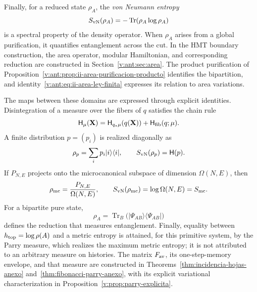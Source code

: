 Finally, for a reduced state \(\rho_A\), the \emph{von Neumann
entropy}
\[
 S_{\rm vN}(\rho_A)=-\operatorname{Tr}(\rho_A\log\rho_A)
\]
is a spectral property of the density operator. When \(\rho_A\)
arises from a global purification, it quantifies entanglement across
the cut. In the HMT boundary construction, the area operator, modular
Hamiltonian, and corresponding reduction are constructed in
Section~\ref{v:ant:sec:area}. The product purification of
Proposition~\ref{v:ant:prop:ii-area-purificacion-producto} identifies
the bipartition, and identity~\eqref{v:ant:eq:ii-area-ley-finita}
expresses its relation to area variations.

The maps between these domains are expressed through explicit identities.
Disintegration of a measure over the fibers of \(q\) satisfies the chain
rule
\begin{equation}
 \mathsf H_\mu(\mathbf X)
 =\mathsf H_{q_*\mu}(q(\mathbf X))
  +\mathsf H_{\rm fib}(q;\mu).
 \label{v:rec:eq:cadena-entropia-fibras-rev2}
\end{equation}
A finite distribution \(p=(p_i)\) is realized diagonally as
\[
 \rho_p=\sum_i p_i|i\rangle\langle i|,
 \qquad S_{\rm vN}(\rho_p)=\mathsf H(p).
\]
If \(P_{N,E}\) projects onto the microcanonical subspace of dimension
\(\Omega(N,E)\), then
\[
 \rho_{\rm mc}=\frac{P_{N,E}}{\Omega(N,E)},
 \qquad S_{\rm vN}(\rho_{\rm mc})=\log\Omega(N,E)=S_{\rm mc}.
\]
For a bipartite pure state,
\[
 \rho_A=\operatorname{Tr}_B
 \bigl(|\Psi_{AB}\rangle\langle\Psi_{AB}|\bigr)
\]
defines the reduction that measures entanglement. Finally, equality between
\(h_{\rm top}=\log\rho(A)\) and a metric entropy is attained, for this
primitive system, by the Parry measure, which realizes the maximum metric
entropy; it is not attributed to an arbitrary measure on histories. The matrix
\(F_{\rm av}\), its one-step-memory envelope, and that measure are
constructed in Theorems~\ref{thm:incidencia-hojas-anexo}
and~\ref{thm:fibonacci-parry-anexo}, with its explicit variational
characterization in Proposition~\ref{v:prop:parry-explicita}.
